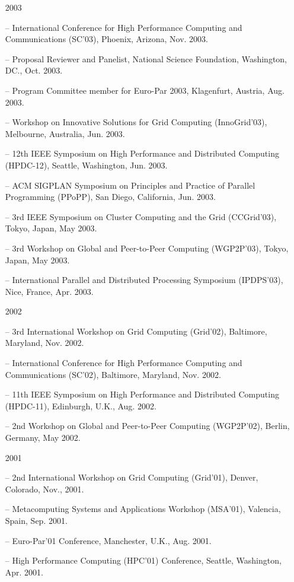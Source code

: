 \documentclass[times,11pt]{letter}
\begin{document}
\begin{itemize}
\item [2003]
\item[--]  International Conference for High Performance Computing and Communications (SC'03), Phoenix, Arizona, Nov. 2003.
\item[--] Proposal Reviewer and Panelist, National Science Foundation, Washington, DC., Oct. 2003.
\item[--] Program Committee member for Euro-Par 2003, Klagenfurt, Austria, Aug. 2003.
\item[--]  Workshop on Innovative Solutions for Grid Computing (InnoGrid'03), Melbourne, Australia, Jun. 2003. 
\item[--]  12th IEEE Symposium on High Performance and Distributed Computing (HPDC-12), Seattle, Washington, Jun. 2003.
\item[--]  ACM SIGPLAN Symposium on Principles and Practice of Parallel Programming (PPoPP), San Diego, California, Jun. 2003.
\item[--]  3rd IEEE Symposium on Cluster Computing and the Grid (CCGrid'03), Tokyo, Japan, May 2003. 
\item[--]  3rd Workshop on Global and Peer-to-Peer Computing (WGP2P'03), Tokyo, Japan, May 2003. 
\item[--]  International Parallel and Distributed Processing Symposium (IPDPS'03), Nice, France, Apr. 2003.

\item [2002]
\item[--]  3rd International Workshop on Grid Computing (Grid'02), Baltimore, Maryland, Nov. 2002.
\item[--]   International Conference for High Performance Computing and Communications (SC'02), Baltimore, Maryland, Nov. 2002.
\item[--]  11th IEEE Symposium on High Performance and Distributed Computing (HPDC-11), Edinburgh, U.K., Aug. 2002.
\item[--]  2nd Workshop on Global and Peer-to-Peer Computing (WGP2P'02), Berlin, Germany, May 2002. 

\item [2001]
\item[--]  2nd International Workshop on Grid Computing (Grid'01), Denver, Colorado, Nov., 2001.
\item[--]  Metacomputing Systems and Applications Workshop (MSA'01), Valencia, Spain, Sep. 2001.
\item[--]  Euro-Par'01 Conference, Manchester, U.K., Aug. 2001.
\item[--]  High Performance Computing (HPC'01) Conference, Seattle, Washington, Apr. 2001.

\end{itemize}
\end{document}
